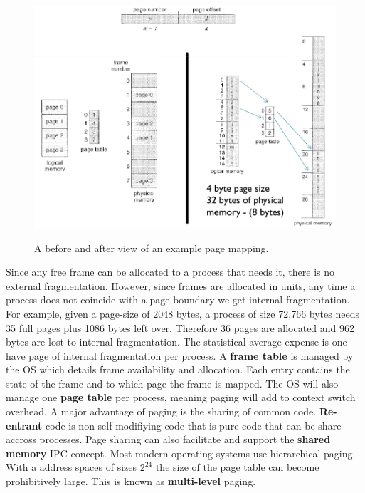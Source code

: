 \documentclass[10pt,a4paper]{article}
\begin{document}
\begin{figure}
\caption{A before and after view of an example page mapping. \cite{OSCONCEPTS}}
\begin{center}
\includegraphics[scale=0.45]{../images/page-mapping.png}
\label{page mapping}
\end{center}
\end{figure}
Since any free frame can be allocated to a process that needs it, there is no external fragmentation. However, since frames are allocated in units, any time a process does not coincide with a page boundary we get internal fragmentation. For example, given a page-size of 2048 bytes, a process of size 72,766 bytes needs 35 full pages plus 1086 bytes left over. Therefore 36 pages are allocated and 962 bytes are lost to internal fragmentation. The statistical average expense is one have page of internal fragmentation per process. 
\newline\newline
A {\bf frame table} is managed by the OS which details frame availability and allocation. Each entry contains the state of the frame and to which page the frame is mapped. The OS will also manage one {\bf page table} per process, meaning paging will add to context switch overhead. 
\newline\newline 
A major advantage of paging is the sharing of common code. {\bf Re-entrant} code is non self-modifiying code that is pure code that can be share accross processes. Page sharing can also facilitate and support the {\bf shared memory} IPC concept. Most modern operating systems use hierarchical paging. With a address spaces of sizes $2^24$ the size of the page table can become prohibitively large. This is known as {\bf multi-level} paging. 
\end{document}
